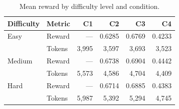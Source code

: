 \begin{table}[htbp]
\centering
\caption{Mean reward by difficulty level and condition.}
\label{tab:difficulty}
\begin{tabular}{llrrrr}
\toprule
Difficulty & Metric & C1 & C2 & C3 & C4 \\
\midrule
  Easy & Reward & --- & 0.6285 & 0.6769 & 0.4233 \\
   & Tokens & 3,995 & 3,597 & 3,693 & 3,523 \\
\addlinespace
  Medium & Reward & --- & 0.6738 & 0.6904 & 0.4442 \\
   & Tokens & 5,573 & 4,586 & 4,704 & 4,409 \\
\addlinespace
  Hard & Reward & --- & 0.6714 & 0.6885 & 0.4383 \\
   & Tokens & 5,987 & 5,392 & 5,294 & 4,745 \\
\bottomrule
\end{tabular}
\end{table}
